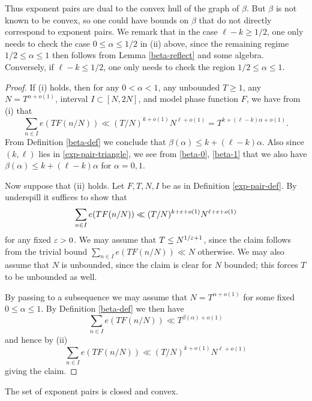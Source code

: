 
Thus exponent pairs are dual to the convex hull of the graph of $\beta$.  But $\beta$ is not known to be convex, so one could have bounds on $\beta$ that do not directly correspond to exponent pairs.  We remark that in the case $\ell - k \geq 1/2$, one only needs to check the case $0 \leq \alpha \leq 1/2$ in (ii) above, since the remaining regime $1/2 \leq \alpha \leq 1$ then follows from Lemma \ref{beta-reflect} and some algebra.  Conversely, if $\ell - k \leq 1/2$, one only needs to check the region $1/2 \leq \alpha \leq 1$.

\begin{proof}  If (i) holds, then for any $0 < \alpha < 1$, any unbounded $T \geq 1$, any $N = T^{\alpha+o(1)}$, interval $I \subset [N,2N]$, and model phase function $F$, we have from (i) that
$$ \sum_{n \in I} e(T F(n/N)) \ll (T/N)^{k+o(1)} N^{\ell+o(1)} = T^{k + (\ell-k)\alpha + o(1)}.$$
From Definition \ref{beta-def} we conclude that $\beta(\alpha) \leq k + (\ell-k) \alpha$.  Also since $(k,\ell)$ lies in \eqref{exp-pair-triangle}, we see from \eqref{beta-0}, \eqref{beta-1} that we also have $\beta(\alpha) \leq k + (\ell-k) \alpha$ for $\alpha=0,1$.

Now suppose that (ii) holds.  Let $F, T, N, I$ be as in Definition \ref{exp-pair-def}.  By underspill it suffices to show that
$$ \sum_{n \in I} e(T F(n/N)) \ll (T/N)^{k+\varepsilon+o(1)} N^{\ell+\varepsilon+o(1)}$$
for any fixed $\varepsilon>0$.  We may assume that $T \leq N^{1/\varepsilon+1}$, since the claim follows from the trivial bound $\sum_{n \in I} e(T F(n/N)) \ll N$ otherwise.  We may also assume that $N$ is unbounded, since the claim is clear for $N$ bounded; this forces $T$ to be unbounded as well.

By passing to a subsequence we may assume that $N = T^{\alpha+o(1)}$ for some fixed $0 \leq \alpha \leq 1$.  By Definition \ref{beta-def} we then have
$$ \sum_{n \in I} e(T F(n/N)) \ll T^{\beta(\alpha)+o(1)}$$
and hence by (ii)
$$ \sum_{n \in I} e(T F(n/N)) \ll (T/N)^{k+o(1)} N^{\ell+o(1)}$$
giving the claim.
\end{proof}


\begin{corollary}\label{exp-pair-closed}
\leanok
The set of exponent pairs is closed and convex.
\end{corollary}

